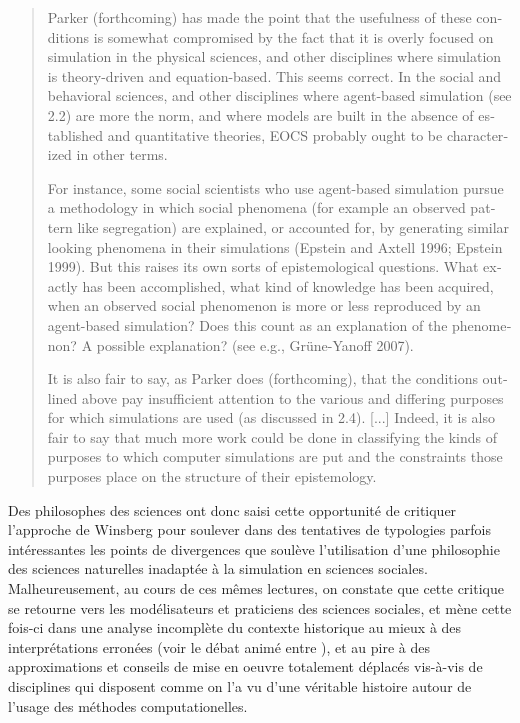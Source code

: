 \foreignblockquote{english}{Parker (forthcoming) has made the point that the usefulness of these conditions is somewhat compromised by the fact that it is overly focused on simulation in the physical sciences, and other disciplines where simulation is theory-driven and equation-based. This seems correct. In the social and behavioral sciences, and other disciplines where agent-based simulation (see 2.2) are more the norm, and where models are built in the absence of established and quantitative theories, EOCS probably ought to be characterized in other terms.

For instance, some social scientists who use agent-based simulation pursue a methodology in which social phenomena (for example an observed pattern like segregation) are explained, or accounted for, by generating similar looking phenomena in their simulations (Epstein and Axtell 1996; Epstein 1999). But this raises its own sorts of  epistemological questions. What exactly has been accomplished, what kind of knowledge has been acquired, when an observed social phenomenon is more or less reproduced by an agent-based simulation? Does this count as an explanation of the phenomenon? A possible explanation?
(see e.g., Grüne-Yanoff 2007).

It is also fair to say, as Parker does (forthcoming), that the conditions outlined above pay insufficient attention to the various and differing purposes for which simulations are used (as discussed in 2.4). [...] Indeed, it is also fair to say that much more work could be done in classifying the kinds of purposes to which computer simulations are put and the constraints those purposes place on the structure of their epistemology.}

Des philosophes des sciences ont donc saisi cette opportunité de critiquer l'approche de Winsberg pour soulever dans des tentatives de typologies parfois intéressantes \autocite{Eckhart2010} les points de divergences que soulève l'utilisation d'une philosophie des sciences naturelles inadaptée à la simulation en sciences sociales. Malheureusement, au cours de ces mêmes lectures, on constate que cette critique se retourne vers les modélisateurs et praticiens des sciences sociales, et mène cette fois-ci dans une analyse incomplète du contexte historique au mieux à des interprétations erronées (voir le débat animé entre \autocite{Yanoff2008}  \autocites{Elsenbroich2012, Chattoe2011}), et au pire à des approximations et conseils de mise en oeuvre totalement déplacés \autocite{Eckhart2010} vis-à-vis de disciplines qui disposent comme on l'a vu d'une véritable histoire autour de l'usage des méthodes computationelles.

